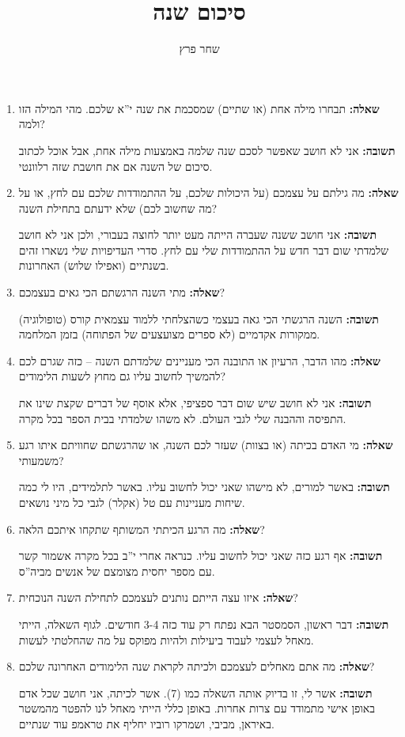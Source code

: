 \documentclass[]{../../../tex/classes/styledArticle}
\author{שחר פרץ}
\title{סיכום שנה}
\begin{document}
	\maketitle
	
	\large 
	\begin{enumerate}
		\item \textbf{שאלה: }תבחרו מילה אחת (או שתיים) שמסכמת את שנה י''א שלכם. מהי המילה הזו ולמה? 
		
		\textbf{תשובה: }אני לא חושב שאפשר לסכם שנה שלמה באמצעות מילה אחת, אבל אוכל לכתוב סיכום של השנה אם את חושבת שזה רלוונטי. 
		
		\item \textbf{שאלה: }מה גילתם על עצמכם (על היכולות שלכם, על ההתמודדות שלכם עם לחץ, או על מה שחשוב לכם) שלא ידעתם בתחילת השנה? 
		
		\textbf{תשובה: }אני חושב ששנה שעברה הייתה מעט יותר לחוצה בעבורי, ולכן אני לא חושב שלמדתי שום דבר חדש על ההתמודדות שלי עם לחץ. סדרי העדיפויות שלי נשארו זהים בשנתיים (ואפילו שלוש) האחרונות. 
		
		\item \textbf{שאלה: }מתי השנה הרגשתם הכי גאים בעצמכם? 
		
		\textbf{תשובה: }השנה הרגשתי הכי גאה בעצמי כשהצלחתי ללמוד עצמאית קורס (טופולוגיה) ממקורות אקדמיים (לא ספרים מצועצעים של הפתוחה) בזמן המלחמה. 
		
		\item \textbf{שאלה: }מהו הדבר, הרעיון או התובנה הכי מעניינים שלמדתם השנה – כזה שגרם לכם להמשיך לחשוב עליו גם מחוץ לשעות הלימודים? 
		
		\textbf{תשובה: }אני לא חושב שיש שום דבר ספציפי, אלא אוסף של דברים שקצת שינו את התפיסה וההבנה שלי לגבי העולם. לא משהו שלמדתי בבית הספר בכל מקרה. 
		
		\item \textbf{שאלה: }מי האדם בכיתה (או בצוות) שעזר לכם השנה, או שהרגשתם שחוויתם איתו רגע משמעותי? 
		
		\textbf{תשובה: }באשר למורים, לא מישהו שאני יכול לחשוב עליו. באשר לתלמידים, היו לי כמה שיחות מעניינות עם טל (אקלר) לגבי כל מיני נושאים. 
		
		\item \textbf{שאלה: }מה הרגע הכיתתי המשותף שתקחו איתכם הלאה? 
		
		\textbf{תשובה: }אף רגע כזה שאני יכול לחשוב עליו. כנראה אחרי י''ב בכל מקרה אשמור קשר עם מספר יחסית מצומצם של אנשים מביה''ס. 
		
		\item \textbf{שאלה: }איזו עצה הייתם נותנים לעצמכם לתחילת השנה הנוכחית? 
		
		\textbf{תשובה: }דבר ראשון, הסמסטר הבא נפתח רק עוד כזה 3-4 חודשים. לגוף השאלה, הייתי מאחל לעצמי לעבוד ביעילות ולהיות מפוקס על מה שהחלטתי לעשות. 
		
		\item \textbf{שאלה: }מה אתם מאחלים לעצמכם ולכיתה לקראת שנה הלימודים האחרונה שלכם? 
		
		\textbf{תשובה: }אשר לי, זו בדיוק אותה השאלה כמו (7). אשר לכיתה, אני חושב שכל אדם באופן אישי מתמודד עם צרות אחרות. באופן כללי הייתי מאחל לנו להפטר מהמשטר באיראן, מביבי, ושמרקו רוביו יחליף את טראמפ עוד שנתיים. 
	\end{enumerate}
	
	\ndoc
\end{document}
